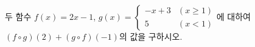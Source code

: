 두 함수 $f(x)=2x-1$, $g(x)=\begin{cases} -x+3 & (x\ge 1) \\ 5 & (x<1) \end{cases}$에 대하여 $(f\circ g)(2)+(g\circ f)(-1)$의 값을 구하시오.
